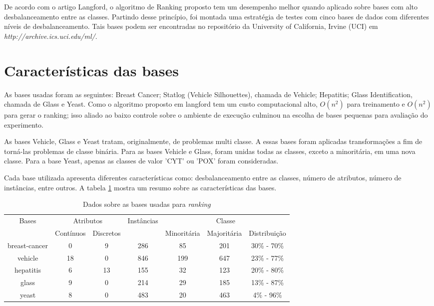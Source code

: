 De acordo com o artigo {{Langford}}, o algoritmo de Ranking proposto tem um desempenho melhor quando aplicado sobre bases com alto desbalanceamento entre as classes. Partindo desse princípio, foi montada uma estratégia de testes com cinco bases de dados com diferentes níveis de desbalanceamento. Tais bases podem ser encontradas no repositório da University of California, Irvine (UCI) em \emph{http://archive.ics.uci.edu/ml/}.

\section{Características das bases}

As bases usadas foram as seguintes: Breast Cancer; Statlog (Vehicle Silhouettes), chamada de Vehicle; Hepatitis; Glass Identification, chamada de Glass e Yeast. Como o algoritmo proposto em {{langford}} tem um custo computacional alto, $O(n^2)$ para treinamento e $O(n^2)$ para gerar o ranking; isso aliado ao baixo controle sobre o ambiente de execução culminou na escolha de bases pequenas para avaliação do experimento.

As bases Vehicle, Glass e Yeast tratam, originalmente, de problemas multi classe. A essas bases foram aplicadas transformações a fim de torná-las problemas de classe binária. Para as bases Vehicle e Glass, foram unidas todas as classes, exceto a minoritária, em uma nova classe. Para a base Yeast, apenas as classes de valor 'CYT' ou 'POX' foram consideradas.

Cada base utilizada apresenta diferentes características como: desbalanceamento entre as classes, número de atributos, número de instâncias, entre outros. A tabela \ref{datasets_characteristics} mostra um resumo sobre as características das bases.

\begin{table}[h]

    \begin{tabular}{c c c c c c c}
        \hline
        \multirow{2}{*}{Bases} & \multicolumn{2}{c}{Atributos} & \multirow{2}{*}{Instâncias} & \multicolumn{3}{c}{Classe} \\ \cline{2-3} \cline{5-7}
        & {\small Contínuos} & {\small Discretos} & & {\small Minoritária} & {\small Majoritária} & {\small Distribuição}\\
        \hline
        breast-cancer & 0 & 9 & 286 & 85 & 201 & 30\% - 70\%\\
        vehicle & 18 & 0  & 846 & 199 & 647 & 23\% - 77\%\\
        hepatitis & 6 & 13  & 155 & 32 & 123 & 20\% - 80\%\\
        glass & 9 & 0  & 214 & 29 & 185 & 13\% - 87\%\\
        yeast & 8 & 0  & 483 & 20 & 463 & 4\% - 96\%\\
        \hline
    \end{tabular}

    \caption{Dados sobre as bases usadas para \emph{ranking}}
    \label{datasets_characteristics}

\end{table}

